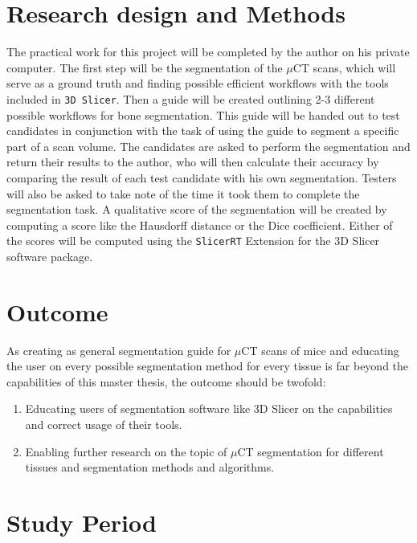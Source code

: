 \clearpage
\section{Research design and Methods}
\begin{body}
	The practical work for this project will be completed by the author on his private computer.
	The first step will be the segmentation of the $\mu$CT scans, which will serve as a ground truth and finding possible efficient workflows with the tools included in \texttt{3D Slicer}.
	Then a guide will be created outlining 2-3 different possible workflows for bone segmentation.
	This guide will be handed out to test candidates in conjunction with the task of using the guide to segment a specific part of a scan volume.
	The candidates are asked to perform the segmentation and return their results to the author, who will then calculate their accuracy by comparing the result of each test candidate with his own segmentation. Testers will also be asked to take note of the time it took them to complete the segmentation task. A qualitative score of the segmentation will be created by computing a score like the Hausdorff distance\cite{birsanOneHundredYears2006} or the Dice coefficient\cite{diceMeasuresAmountEcologic1945}. Either of the scores will be computed using the \texttt{SlicerRT}\cite{pinterSlicerRTRadiationTherapy2012} Extension for the 3D Slicer software package.
\end{body}

\section{Outcome}
\begin{body}
	As creating as general segmentation guide for $\mu$CT scans of mice and educating the user on every possible segmentation method for every tissue is far beyond the capabilities of this master thesis, the outcome should be twofold:
	\begin{enumerate}
		\item Educating users of segmentation software like 3D Slicer on the capabilities and correct usage of their tools.
		\item Enabling further research on the topic of $\mu$CT segmentation for different tissues and segmentation methods and algorithms.
	\end{enumerate}
\end{body}

\clearpage
\section{Study Period}
